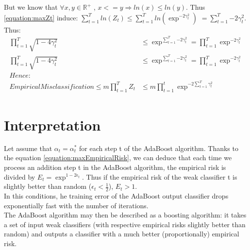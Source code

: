 \documentclass[12pt]{article}											%
\begin{document}
But we know that $\forall x, y \in \mathbb{R}^+$ ,  $x <= y \Rightarrow  ln(x) \leq ln(y)$.   Thus \ref{equation:maxZt} induce:  $\sum_{t=1}^{T}{ln(Z_t)}  \leq \sum_{t=1}^{T}{ln(\exp^{-2 \gamma_t ^2} )}$  $ = \sum_{t=1}^{T}{-2 \gamma_t ^2}$.   Thus:
	\begin{equation}
    \begin{aligned}
		\prod_{t=1}^{T}{\sqrt{1 - 4 \gamma_t ^2}}	&\leq \exp^{\sum_{t=1}^{T}{-2 \gamma_t ^2  } } = \prod_{t=1}^{T}{\exp^{-2 \gamma_t ^2 } } \\ 
		\prod_{t=1}^{T}{\sqrt{1 - 4 \gamma_t ^2}}	& \leq \exp^{\sum_{t=1}^{T}{-2 \gamma_t ^2} }  = \prod_{t=1}^{T}{\exp^{-2 \gamma_t ^2} } \\
        Hence: \\                                                                                                 
 		EmpiricalMisclassification \leq m   \prod_{t=1}^{T}{Z_t}	&  \leq m \prod_{t=1}^{t} {\exp^{-2 \sum_{t=1}^{T}{\gamma_t ^2}}}  \\
     \label{equation:maxEmpiricalRisk}
	\end{aligned}
	\end{equation}
    
%
\section{Interpretation}
Let assume that $\alpha_t = \alpha_t^*$ for each step t of the AdaBoost algorithm.   Thanks to the equation \ref{equation:maxEmpiricalRisk}, we can deduce that each time we process an addition step t in the AdaBoost algorithm, the empirical risk is divided by $E_t = \exp^{1 - 2 \epsilon_t}$.   Thus if the empirical risk of the weak classifier t is slightly better than random ($\epsilon_t < \frac{1}{2}$), $E_t > 1$.\\
In this conditions, he training error of the AdaBoost output classifier drops exponentially fast with the number of iterations.\\

The AdaBoost algorithm may then be described as a boosting algorithm: it takes a set of input weak classifiers (with respective empirical risks slightly better than random) and outputs a classifier with a much better (proportionally) empirical risk.\\



\nocite{*}
\small{
\vspace{0.75in}}
\end{document}

